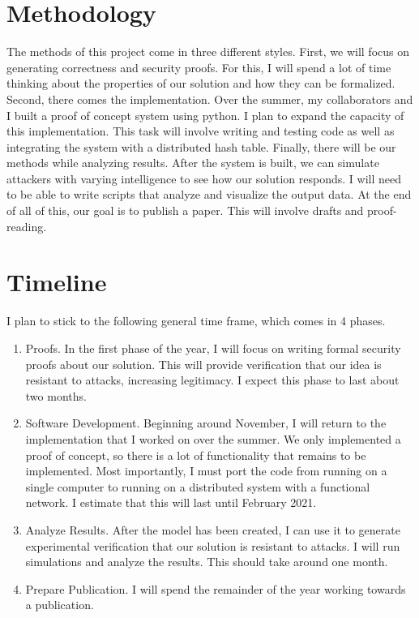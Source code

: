 \section{Methodology}
\label{sec:methodology}

The methods of this project come in three different styles.
First, we will focus on generating correctness and security proofs.
For this, I will spend a lot of time thinking about the properties of our solution and how they can be formalized.
Second, there comes the implementation.
Over the summer, my collaborators and I built a proof of concept system using python.
I plan to expand the capacity of this implementation.
This task will involve writing and testing code as well as integrating the system with a distributed hash table.
Finally, there will be our methods while analyzing results.
After the system is built, we can simulate attackers with varying intelligence to see how our solution responds.
I will need to be able to write scripts that analyze and visualize the output data.
At the end of all of this, our goal is to publish a paper.
This will involve drafts and proof-reading.

\section{Timeline}

I plan to stick to the following general time frame, which comes in 4 phases.
\begin{enumerate}
    \item Proofs.
    In the first phase of the year, I will focus on writing formal security proofs about our solution.
    This will provide verification that our idea is resistant to attacks, increasing legitimacy.
    I expect this phase to last about two months.
    \item Software Development.
    Beginning around November, I will return to the implementation that I worked on over the summer.
    We only implemented a proof of concept, so there is a lot of functionality that remains to be implemented.
    Most importantly, I must port the code from running on a single computer to running on a distributed system with a functional network.
    I estimate that this will last until February 2021.
    \item Analyze Results.
    After the model has been created, I can use it to generate experimental verification that our solution is resistant to attacks.
    I will run simulations and analyze the results.
    This should take around one month.
    \item Prepare Publication.
    I will spend the remainder of the year working towards a publication.
\end{enumerate}
